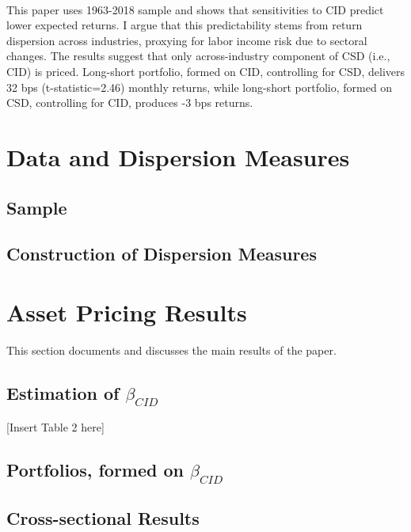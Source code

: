 \documentclass[12pt]{article}
\begin{document}
\paragraph{}
This paper uses 1963-2018 sample and shows that sensitivities to CID predict lower expected returns. I argue that this predictability stems from return dispersion across industries, proxying for labor income risk due to sectoral changes. The results suggest that only across-industry component of CSD (i.e., CID) is priced. Long-short portfolio, formed on CID, controlling for CSD, delivers 32 bps (t-statistic=2.46) monthly returns, while long-short portfolio, formed on CSD, controlling for CID, produces -3 bps returns. 








\section{Data and Dispersion Measures} \label{sec:Model}
\subsection{Sample}
\subsection{Construction of Dispersion Measures}


\section{Asset Pricing Results} \label{sec:Model}
This section documents and discusses the main results of the paper. 
\subsection{Estimation of $\beta_{CID}$}
\begin{center}
[Insert Table 2 here] 
\end{center}
\subsection{Portfolios, formed on $\beta_{CID}$}
\subsection{Cross-sectional Results}
\end{document}
